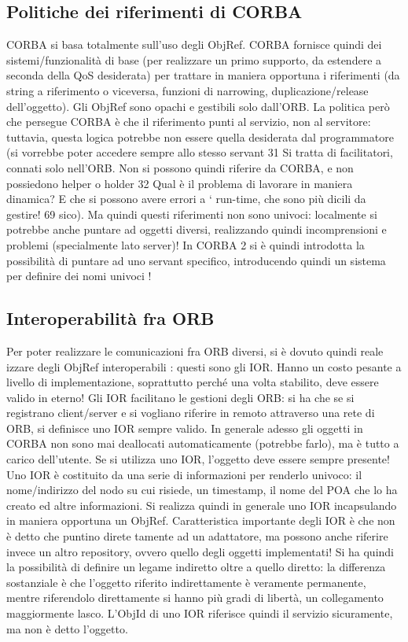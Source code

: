 \subsection{Politiche dei riferimenti di CORBA}
CORBA si basa totalmente sull'uso degli ObjRef. CORBA fornisce quindi dei
sistemi/funzionalità di base (per realizzare un primo supporto, da estendere a
seconda della QoS desiderata) per trattare in maniera opportuna i riferimenti
(da string a riferimento o viceversa, funzioni di narrowing, duplicazione/release
dell'oggetto). Gli ObjRef sono opachi e gestibili solo dall'ORB.
La politica però che persegue CORBA è che il riferimento punti al servizio,
non al servitore: tuttavia, questa logica potrebbe non essere quella desiderata dal programmatore (si vorrebbe poter
accedere sempre allo stesso servant
31 Si tratta di facilitatori, connati solo nell'ORB. Non si possono quindi riferire da CORBA,
e non possiedono helper o holder
32 Qual è il problema di lavorare in maniera dinamica? E che si possono avere errori a
`
run-time, che sono più dicili da gestire!
69
sico). Ma quindi questi riferimenti non sono univoci: localmente si potrebbe
anche puntare ad oggetti diversi, realizzando quindi incomprensioni e problemi
(specialmente lato server)!
In CORBA 2 si è quindi introdotta la possibilità di puntare ad uno servant
specifico, introducendo quindi un sistema per definire dei nomi univoci !
\subsection{Interoperabilità fra ORB}
Per poter realizzare le comunicazioni fra ORB diversi, si è dovuto quindi reale
izzare degli ObjRef interoperabili : questi sono gli IOR. Hanno un costo pesante
a livello di implementazione, soprattutto perché una volta stabilito, deve essere
valido in eterno!
Gli IOR facilitano le gestioni degli ORB: si ha che se si registrano client/server
e si vogliano riferire in remoto attraverso una rete di ORB, si definisce uno IOR
sempre valido. In generale adesso gli oggetti in CORBA non sono mai deallocati
automaticamente (potrebbe farlo), ma è tutto a carico dell'utente. Se si utilizza uno IOR, l'oggetto deve essere
sempre presente!
Uno IOR è costituito da una serie di informazioni per renderlo univoco: il nome/indirizzo del nodo su cui risiede, un
timestamp, il nome del POA che lo ha
creato ed altre informazioni. Si realizza quindi in generale uno IOR incapsulando
in maniera opportuna un ObjRef.
Caratteristica importante degli IOR è che non è detto che puntino direte
tamente ad un adattatore, ma possono anche riferire invece un altro repository, ovvero quello degli oggetti
implementati! Si ha quindi la possibilità di
definire un legame indiretto oltre a quello diretto: la differenza sostanziale è che l'oggetto riferito indirettamente è
veramente permanente, mentre riferendolo direttamente si hanno più gradi di libertà, un collegamento maggiormente
lasco. L'ObjId di uno IOR riferisce quindi il servizio sicuramente, ma non è detto l'oggetto.
